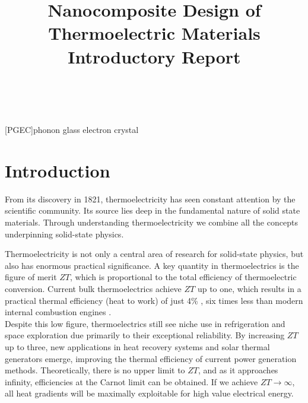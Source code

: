 \documentclass[a4paper,10pt,journal]{IEEEtran}
\begin{document}
\title{Nanocomposite Design of Thermoelectric Materials\\Introductory
Report}
\author{\\
}

[PGEC]{phonon glass electron crystal}


\maketitle

\section{Introduction}

From its discovery in 1821, thermoelectricity has seen constant
attention by the scientific community. Its source lies deep in the
fundamental nature of solid state materials. Through understanding
thermoelectricity we combine all the concepts underpinning solid-state physics. 

Thermoelectricity is not only a central area of research for
solid-state physics, but also has enormous practical significance. A key quantity in thermoelectrics is the figure of merit $ZT$, which is proportional to the total efficiency of thermoelectric conversion. Current bulk thermoelectrics achieve $ZT$ up to
one, which results in a practical thermal efficiency (heat to work) of
just 4\% \cite{minnich-review}, six times less than modern internal combustion engines \cite{engine-efficiency}.\\
Despite this low figure, thermoelectrics still see niche use
in refrigeration and space exploration due primarily to their
exceptional reliability. By increasing $ZT$ up to three, new
applications in heat recovery systems and solar thermal generators
emerge, improving the thermal efficiency of current power generation
methods. Theoretically, there is no upper limit to $ZT$, and as it
approaches infinity, efficiencies at the Carnot limit can be obtained.
If we achieve $ZT \to\infty$, all heat gradients will be maximally
exploitable for high value electrical energy.
\end{document}
